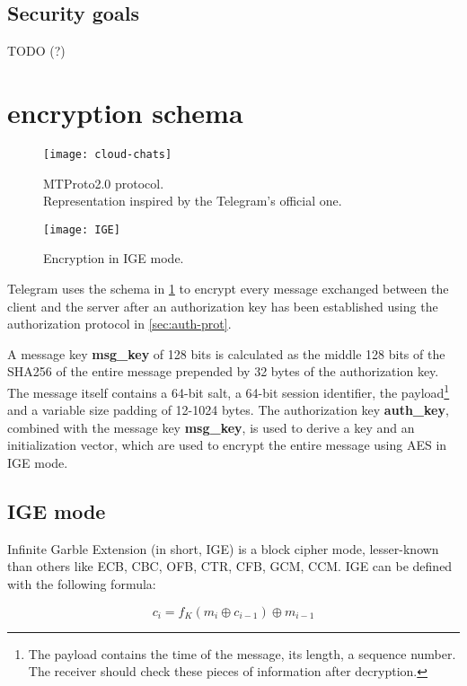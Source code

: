 \subsection{Security goals}
TODO (?)



\section{\Cchat{} encryption schema}
\label{sec:cloud-chat}

\begin{figure}[t]
  \centering
  \texttt{[image: cloud-chats]}
  \caption{MTProto2.0 \cchat{} protocol.\\Representation inspired by the Telegram's official one.}
  \label{fig:cloud-chat-protocol}
\end{figure}
\begin{figure}[t]
  \centering
  \texttt{[image: IGE]}
  \caption{Encryption in IGE mode.}
  \label{fig:IGE}
\end{figure}

Telegram uses the schema in \cref{fig:cloud-chat-protocol} to encrypt every message exchanged between the client and the server after an authorization key has been established using the authorization protocol in \cref{sec:auth-prot}.

A message key \textbf{msg\_key} of 128 bits is calculated as the middle 128 bits of the SHA256 of the entire message prepended by 32 bytes of the authorization key. The message itself contains a 64-bit salt, a 64-bit session identifier, the payload\footnote{The payload contains the time of the message, its length, a sequence number. The receiver should check these pieces of information after decryption.} and a variable size padding of 12-1024 bytes.
The authorization key \textbf{auth\_key}, combined with the message key \textbf{msg\_key}, is used to derive a key and an initialization vector, which are used to encrypt the entire message using AES in IGE mode.

\subsection{IGE mode}
Infinite Garble Extension (in short, IGE) is a block cipher mode, lesser-known than others like ECB, CBC, OFB, CTR, CFB, GCM, CCM.
IGE can be defined with the following formula:

\begin{equation}
  c_i = f_K(m_i \oplus c_{i-1}) \oplus m_{i-1}
\end{equation}

